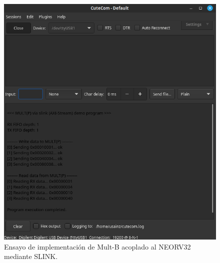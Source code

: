 \begin{figure}[H]
    \centering
    \includegraphics[width=14cm]{Figuras/impl1.png}
    \caption{Ensayo de implementación de Mult-B acoplado al NEORV32 mediante SLINK.}
    \label{fig:impl1}
\end{figure}

